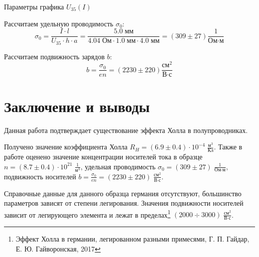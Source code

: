 \documentclass[12pt,a4paper]{article}
\begin{document}
	\begin{table}[h]
		\caption{Параметры графика $U_{35} (I)$}
		
	\end{table}
	
	Рассчитаем удельную проводимость $\sigma_0$:
	$$ \sigma_0 = \frac{I \cdot l}{U_{35} \cdot h \cdot a} = \frac{ 5.0 \; \text{мм} }{ 4.04 \; \text{Ом} \cdot 1.0 \; \text{мм} \cdot 4.0 \; \text{мм}} = (309 \pm 27) \frac{1}{\text{Ом} \cdot \text{м}} $$
	
	Рассчитаем подвижность зарядов $b$:
	$$ b = \frac{\sigma_0}{e n} = (2230 \pm 220) \frac{\text{см}^2}{\text{В} \cdot \text{с}} $$
	
	\section*{Заключение и выводы}
	
	Данная работа подтверждает существование эффекта Холла в полупроводниках.
	
	Получено значение коэффициента Холла $ R_H = (6.9 \pm 0.4) \cdot 10^{-4} \; \frac{\text{м}^3}{\text{Кл}} $. Также в работе оценено значение концентрации носителей тока в образце $ n = (8.7 \pm 0.4) \cdot 10^{21} \; \frac{1}{\text{м}^3} $, удельная проводимость $ \sigma_0 = (309 \pm 27) \; \frac{1}{\text{Ом} \cdot \text{м}} $, подвижность носителей $ b = \frac{\sigma_0}{e n} = (2230 \pm 220) \; \frac{\text{см}^2}{\text{В} \cdot \text{с}} $.
	
	Справочные данные для данного образца германия отсутствуют, большинство параметров зависят от степени легирования. Значения подвижности носителей зависит от легирующего элемента и лежат в пределах\footnote{Эффект Холла в германии, легированном разными примесями, Г. П. Гайдар, Е. Ю. Гайворонская, 2017} $(2000 \div 3000) \; \frac{\text{см}^2}{\text{В} \cdot \text{с}}$.
	
\end{document}
